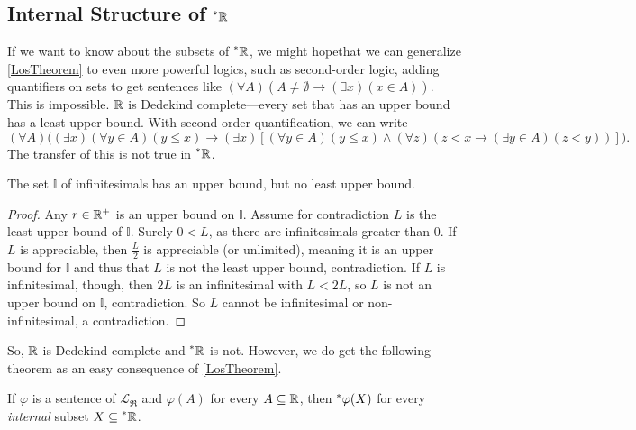 \subsection{Internal Structure of \texorpdfstring{$\prescript{*}{}{\mathbb{R}}$}{*R}}
If we want to know about the subsets of $\prescript{*}{}{\mathbb{R}}$, we might hopethat we can generalize \autoref{LosTheorem} to even more powerful logics, such as second-order logic, adding quantifiers on sets to get sentences like $(\forall A)(A \neq \emptyset \to (\exists x)(x \in A))$. This is impossible. $\mathbb{R}$ is Dedekind complete---every set that has an upper bound has a least upper bound. With second-order quantification, we can write
\[ (\forall A)\big((\exists x)(\forall y \in A)(y \leq x) \to (\exists x)[(\forall y \in A)(y \leq x) \land (\forall z)(z < x \to (\exists y \in A)(z < y))]\big). \]
The transfer of this is not true in $\prescript{*}{}{\mathbb{R}}$.

\begin{thm}\label{INoUpperBound}
    The set $\mathbb{I}$ of infinitesimals has an upper bound, but no least upper bound.
\end{thm}

\begin{proof}
    Any $r \in \mathbb{R}^+$ is an upper bound on $\mathbb{I}$. Assume for contradiction $L$ is the least upper bound of $\mathbb{I}$. Surely $0 < L$, as there are infinitesimals greater than $0$. If $L$ is appreciable, then $\frac{L}{2}$ is appreciable (or unlimited), meaning it is an upper bound for $\mathbb{I}$ and thus that $L$ is not the least upper bound, contradiction. If $L$ is infinitesimal, though, then $2L$ is an infinitesimal with $L < 2L$, so $L$ is not an upper bound on $\mathbb{I}$, contradiction. So $L$ cannot be infinitesimal or non-infinitesimal, a contradiction.
\end{proof}

So, $\mathbb{R}$ is Dedekind complete and $\prescript{*}{}{\mathbb{R}}$ is not. However, we do get the following theorem as an easy consequence of \autoref{LosTheorem}.

\begin{thm}
    If $\varphi$ is a sentence of $\mathcal{L}_\mathfrak{R}$ and $\varphi(A)$ for every $A \subseteq \mathbb{R}$, then $\prescript{*}{}{\varphi}(X)$ for every \textit{internal} subset $X \subseteq \prescript{*}{}{\mathbb{R}}$.
\end{thm}

